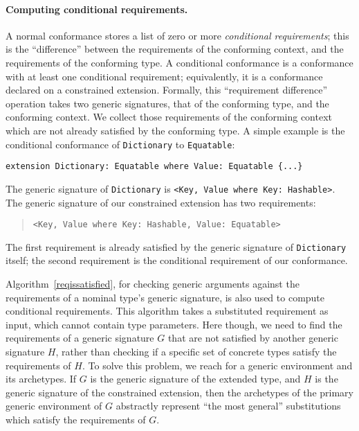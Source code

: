 \documentclass[../generics]{subfiles}
\begin{document}
\paragraph{Computing conditional requirements.}
A normal conformance stores a list of zero or more \emph{conditional requirements}; this is the ``difference'' between the requirements of the conforming context, and the requirements of the conforming type. A conditional conformance is a conformance with at least one conditional requirement; equivalently, it is a conformance declared on a constrained extension. Formally, this ``requirement difference'' operation takes two generic signatures, that of the conforming type, and the conforming context. We collect those requirements of the conforming context which are not already satisfied by the conforming type. 
A simple example is the conditional conformance of \texttt{Dictionary} to \texttt{Equatable}:
\begin{Verbatim}
extension Dictionary: Equatable where Value: Equatable {...}
\end{Verbatim}
The generic signature of \texttt{Dictionary} is \verb|<Key, Value where Key: Hashable>|. The generic signature of our constrained extension has two requirements:
\begin{quote}
\begin{verbatim}
<Key, Value where Key: Hashable, Value: Equatable>
\end{verbatim}
\end{quote}
The first requirement is already satisfied by the generic signature of \texttt{Dictionary} itself; the second requirement is the conditional requirement of our conformance.

Algorithm~\ref{reqissatisfied}, for checking generic arguments against the requirements of a nominal type's generic signature, is also used to compute conditional requirements. This algorithm takes a substituted requirement as input, which cannot contain type parameters. Here though, we need to find the requirements of a generic signature $G$ that are not satisfied by another generic signature $H$, rather than checking if a specific set of concrete types satisfy the requirements of $H$. To solve this problem, we reach for a generic environment and its archetypes. If $G$ is the generic signature of the extended type, and $H$ is the generic signature of the constrained extension, then the archetypes of the primary generic environment of $G$ abstractly represent ``the most general'' substitutions which satisfy the requirements of $G$.
\end{document}

